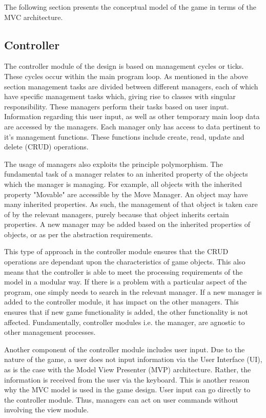 \documentclass[10pt,twocolumn]{witseiepaper}
\begin{document}
The following section presents the conceptual model of the game in terms of the MVC architecture.

\subsection{Controller}
\label{sub:controller}
The controller module of the design is based on management cycles or ticks. These cycles occur within the main program loop. As mentioned in the above section management tasks are divided between different managers, each of which have specific management tasks which, giving rise to classes with singular responsibility. These managers perform their tasks based on user input. Information regarding this user input, as well as other temporary main loop data are accessed by the managers. Each manager only has access to data pertinent to it's management functions. These functions include create, read, update and delete (CRUD) operations.

The usage of managers also exploits the principle polymorphism. The fundamental task of a manager relates to an inherited property of the objects which the manager is managing. For example, all objects with the inherited property "Movable" are accessible by the Move Manager. An object may have many inherited properties. As such, the management of that object is taken care of by the relevant managers, purely because that object inherits certain properties. A new manager may be added based on the inherited properties of objects, or as per the abstraction requirements.

This type of approach in the controller module ensures that the CRUD operations are dependant upon the characteristics of game objects. This also means that the controller is able to meet the processing requirements of the model in a modular way. If there is a problem with a particular aspect of the program, one simply needs to search in the relevant manager. If a new manager is added to the controller module, it has impact on the other managers. This ensures that if new game functionality is added, the other functionality is not affected. Fundamentally, controller modules i.e. the manager, are agnostic to other management processes.

Another component of the controller module includes user input. Due to the nature of the game, a user does not input information via the User Interface (UI), as is the case with the Model View Presenter (MVP) architecture. Rather, the information is received from the user via the keyboard. This is another reason why the MVC model is used in the game design. User input can go directly to the controller module. Thus, managers can act on user commands without involving the view module.
\end{document}
